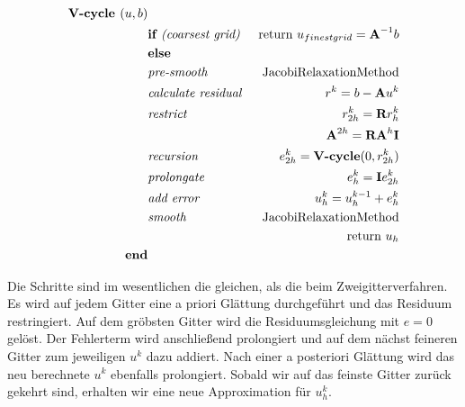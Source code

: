 \begin{eqnarray}
\textbf{V-cycle }(u,b)                         & \notag \\
&\textbf{if }\textit{(coarsest grid) }&\textnormal{return } u_{finest grid}={\textbf{A}}^{-1}b \notag \\
&\textbf{else }                                                & \notag \\
&\textit{pre-smooth }                                 &\textnormal{JacobiRelaxationMethod} \notag \\
&\textit{calculate residual }                &r^{k} = b - {\textbf{A}}u^{k} \notag \\
&\textit{restrict }                                 &r^{k}_{2h}={\textbf{R}}r^{k}_{h} \notag \\
&                                                                        &{\textbf{A}}^{2h} = {\textbf{R}}{\textbf{A}}^{h}{\textbf{I}} \notag \\
&\textit{recursion }                                &e^{k}_{2h} = \textbf{V-cycle}(0,r^{k}_{2h}) \notag \\
&\textit{prolongate }                                &e^{k}_{h} = {\textbf{I}}e^{k}_{2h} \notag \\
&\textit{add error }                                &u^{k}_{h} = u^{k-1}_{h} + e^{k}_{h} \notag \\
&\textit{smooth }                                        &\textnormal{JacobiRelaxationMethod} \notag \\
&                                                                        &\textnormal{return } u_{h} \notag \\
\textbf{end}                                                & \notag
\end{eqnarray}

Die Schritte sind im wesentlichen die gleichen, als die beim Zweigitterverfahren. Es wird auf jedem Gitter eine a priori Glättung durchgeführt und das Residuum restringiert. Auf dem gröbsten Gitter wird die Residuumsgleichung mit $e = 0$ gelöst. Der Fehlerterm wird anschließend prolongiert und auf dem nächst feineren Gitter zum jeweiligen $u^{k}$ dazu addiert. Nach einer a posteriori Glättung wird das neu berechnete $u^{k}$ ebenfalls prolongiert. Sobald wir auf das feinste Gitter zurück gekehrt sind, erhalten wir eine neue Approximation für $u_{h}^{k}$.

 \label{V-Cycle}


